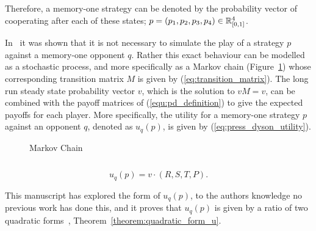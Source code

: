 Therefore, a memory-one strategy can be denoted by the probability vector of
cooperating after each of these states; \(p=(p_1, p_2, p_3, p_4) \in \mathbb{R}_{[0,1]}
^ 4\).

In~\cite{Nowak1989} it was shown that it is not necessary to simulate the play
of a strategy $p$ against a memory-one opponent $q$. Rather this exact behaviour
can be modelled as a stochastic process, and more specifically as a Markov chain
(Figure~\ref{fig:markov_chain}) whose corresponding transition matrix \(M\) is
given by (\ref{eq:transition_matrix}). The long run steady state probability
vector \(v\), which is the solution to \(v M = v\), can be
combined with the payoff matrices of (\ref{equ:pd_definition}) to give the expected
payoffs for each player. More specifically, the utility for a memory-one
strategy \(p\) against an opponent \(q\), denoted as \(u_q(p)\), is given by
(\ref{eq:press_dyson_utility}).

\begin{figure}
    \centering
    
    \caption{Markov Chain}
    \label{fig:markov_chain}
\end{figure}

\begin{equation}\label{eq:transition_matrix}
    
\end{equation}


\begin{equation}\label{eq:press_dyson_utility}
    u_q(p) = v \cdot (R, S, T, P).
\end{equation}

This manuscript has explored the form of \(u_q(p)\), to the authors knowledge no
previous work has done this, and it proves that \(u_q(p)\) is given by a ratio
of two quadratic forms~\cite{kepner2011},
Theorem~\ref{theorem:quadratic_form_u}.

